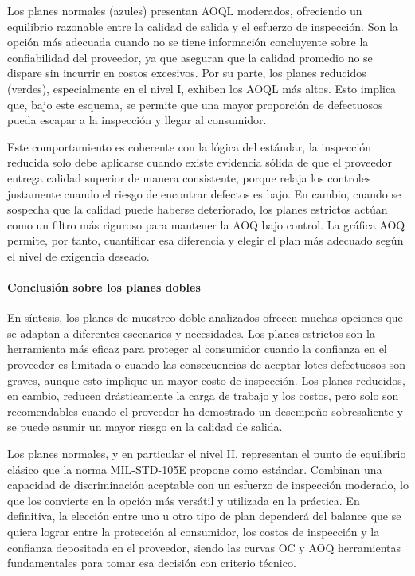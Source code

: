 \documentclass[
  12pt,
]{article}
\begin{document}
Los planes normales (azules) presentan AOQL moderados, ofreciendo un
equilibrio razonable entre la calidad de salida y el esfuerzo de
inspección. Son la opción más adecuada cuando no se tiene información
concluyente sobre la confiabilidad del proveedor, ya que aseguran que la
calidad promedio no se dispare sin incurrir en costos excesivos. Por su
parte, los planes reducidos (verdes), especialmente en el nivel I,
exhiben los AOQL más altos. Esto implica que, bajo este esquema, se
permite que una mayor proporción de defectuosos pueda escapar a la
inspección y llegar al consumidor.

Este comportamiento es coherente con la lógica del estándar, la
inspección reducida solo debe aplicarse cuando existe evidencia sólida
de que el proveedor entrega calidad superior de manera consistente,
porque relaja los controles justamente cuando el riesgo de encontrar
defectos es bajo. En cambio, cuando se sospecha que la calidad puede
haberse deteriorado, los planes estrictos actúan como un filtro más
riguroso para mantener la AOQ bajo control. La gráfica AOQ permite, por
tanto, cuantificar esa diferencia y elegir el plan más adecuado según el
nivel de exigencia deseado.

\paragraph{Conclusión sobre los planes
dobles}\label{conclusiuxf3n-sobre-los-planes-dobles}

En síntesis, los planes de muestreo doble analizados ofrecen muchas
opciones que se adaptan a diferentes escenarios y necesidades. Los
planes estrictos son la herramienta más eficaz para proteger al
consumidor cuando la confianza en el proveedor es limitada o cuando las
consecuencias de aceptar lotes defectuosos son graves, aunque esto
implique un mayor costo de inspección. Los planes reducidos, en cambio,
reducen drásticamente la carga de trabajo y los costos, pero solo son
recomendables cuando el proveedor ha demostrado un desempeño
sobresaliente y se puede asumir un mayor riesgo en la calidad de salida.

Los planes normales, y en particular el nivel II, representan el punto
de equilibrio clásico que la norma MIL-STD-105E propone como estándar.
Combinan una capacidad de discriminación aceptable con un esfuerzo de
inspección moderado, lo que los convierte en la opción más versátil y
utilizada en la práctica. En definitiva, la elección entre uno u otro
tipo de plan dependerá del balance que se quiera lograr entre la
protección al consumidor, los costos de inspección y la confianza
depositada en el proveedor, siendo las curvas OC y AOQ herramientas
fundamentales para tomar esa decisión con criterio técnico.
\end{document}
